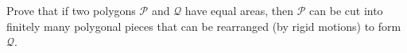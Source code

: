 Prove that if two polygons $\mathcal{P}$ and $\mathcal{Q}$ have equal areas, then $\mathcal{P}$ can be cut into finitely many polygonal pieces that can be rearranged (by rigid motions) to form $\mathcal{Q}$.
